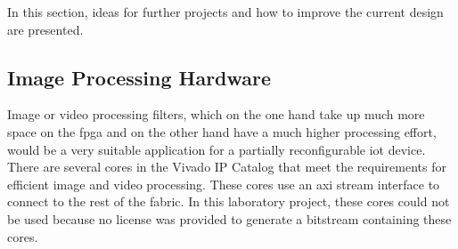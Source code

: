 In this section, ideas for further projects and how to improve the current
design are presented.

\subsection{Image Processing Hardware}
Image or video processing filters, which on the one hand take up much more space on the \gls{fpga} and on the other hand have a much higher processing effort, would be a very suitable application for a partially reconfigurable \gls{iot} device. There are several cores in the Vivado IP Catalog that meet the requirements for efficient image and video processing. These cores use an \gls{axi} stream interface to connect to the rest of the fabric. In this laboratory project, these cores could not be used because no license was provided to generate a bitstream containing these cores.
